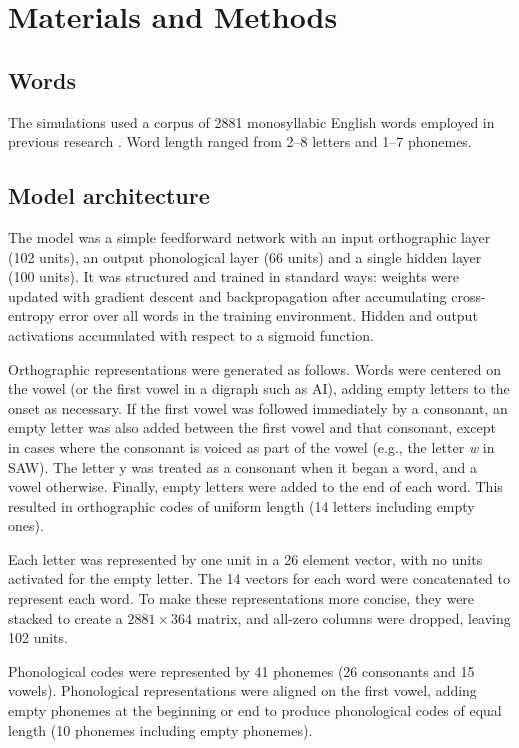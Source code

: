 \documentclass[10pt,letterpaper]{article}
\newcommand{\exword}[1]{\MakeUppercase{#1}}
\newcommand{\gorl}{letter}
\newcommand{\gorls}{\gorl{}s}
\newcommand{\xy}[2]{$#1\times#2$}
\begin{document}
\section{Materials and Methods}

\subsection{Words}

The simulations used a corpus of 2881 monosyllabic English words employed in previous research \cite{Seidenberg1989}. Word length ranged from 2--8 letters and 1--7 phonemes.

\subsection{Model architecture}

The model was a simple feedforward network with an input orthographic layer (102 units), an output phonological layer (66 units) and a single hidden layer (100 units). It was structured and trained in standard ways: weights were updated with gradient descent and backpropagation after accumulating cross-entropy error over all words in the training environment. Hidden and output activations accumulated with respect to a sigmoid function.

Orthographic representations were generated as follows. Words were centered on the vowel (or the first vowel in a digraph such as AI), adding empty \gorls{} to the onset as necessary. If the first vowel was followed immediately by a consonant, an empty \gorl{} was also added between the first vowel and that consonant, except in cases where the consonant is voiced as part of the vowel (e.g., the letter \textit{w} in \exword{saw}). The letter y was treated as a consonant when it began a word, and a vowel otherwise. Finally, empty \gorls{} were added to the end of each word. This resulted in orthographic codes of uniform length (14 \gorls{} including empty ones).

Each \gorl{} was represented by one unit in a 26 element vector, with no units activated for the empty \gorl{}. The 14 vectors for each word were concatenated to represent each word. To make these representations more concise, they were stacked to create a \xy{2881}{364} matrix, and all-zero columns were dropped, leaving 102 units.

Phonological codes were represented by 41 phonemes (26 consonants and 15 vowels).  Phonological representations were aligned on the first vowel, adding empty phonemes at the beginning or end to produce phonological codes of equal length (10 phonemes including empty phonemes).
\end{document}
